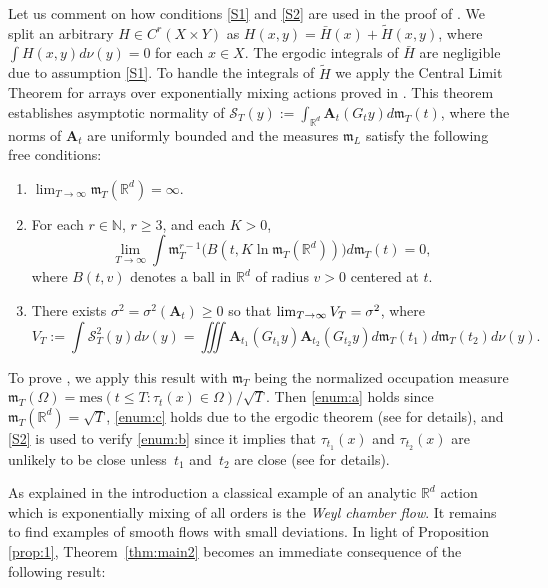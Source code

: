 \documentclass[10pt]{amsart}
\newenvironment{enumeratea}
{\bgroup\def\theenumi{\alph{enumi}}\begin{enumerate}}
{\end{enumerate}\egroup}
\let\DS\relax
\newcommand\cS{\mathcal{S}}
\newcommand\naturals{\mathbb{N}}\let\N\naturals
\newcommand\reals{\mathbb{R}}\let\R\reals
\newcommand\bA{\boldsymbol{A}}
\newcommand\fm{\mathfrak{m}}
\newcommand\mes{\mathrm{mes}}
\theoremstyle{definition}
\theoremstyle{plain}
\begin{document}
Let us comment on how conditions \eqref{S1} and \eqref{S2} are used in the proof of \cite[Th.\,3.2]{DDKN}. We split an arbitrary
$H\in C^r(X\times Y)$ as $H(x,y)=\bar{H}(x)+\tilde{H}(x,y)$,
where $\int H(x,y) d\nu(y)=0$ for each $x\in X$.
The ergodic integrals of $\bar{H}$ are negligible due to assumption \eqref{S1}.
To handle the integrals of $\tilde{H}$ we apply the Central Limit Theorem
for arrays over exponentially mixing actions proved in \cite{BG}.
This theorem establishes asymptotic normality of
$\cS_T(y):=\int_{\reals^d} \bA_t(G_t y) d\fm_T(t)$,
where the norms of $\bA_t$ are uniformly bounded and the measures
$\fm_L$ satisfy the following free conditions:

\begin{enumeratea}
\item\label{enum:a}
$\lim_{T\to\infty}
\fm_T(\R^d)=\infty$.

\item\label{enum:b}
For each $r\in \naturals$, $r\geq 3$, and each $K>0$,\vspace*{-3pt}
\[
\lim_{T\to \infty} \int \fm_T^{r-1}\Big(B(t,K\ln \fm_T(\reals^d))\Big) d\fm_T(t)=0,
\]
where $B(t,v)$ denotes a ball in $\R^d$ of radius $v>0$ centered at $t$.

\item\label{enum:c}
There exists $\sigma^2=\sigma^2(\bA_t)\geq 0 $ so that $\DS \lim_{T\to \infty} V_T=\sigma^2$, where\vspace*{-3pt}\enlargethispage{.5\baselineskip}
\[
V_T:=\int\cS_T^2(y)d\nu(y)= \iiint \bA_{t_1} (G_{t_1} y) \bA_{t_2} (G_{t_2} y) d\fm_T (t_1)
d\fm_T(t_2) d\nu(y).
\]
\end{enumeratea}

To prove \cite[Th.\,3.2]{DDKN}, we apply this result with $\fm_T$ being the normalized occupation measure $\fm_T(\Omega)=\mes(t\leq T: \tau_t(x)\in \Omega)/\sqrt{T}$.
Then \eqref{enum:a} holds since $\fm_T(\reals^d)=\sqrt{T}$, \eqref{enum:c} holds due to the ergodic theorem
(see \cite[\S 5.1.2]{DDKN} for details),
and
\eqref{S2} is used to verify \eqref{enum:b} since it implies that $\tau_{t_1}(x)$ and $\tau_{t_2}(x)$ are
unlikely to be close unless~$t_1$ and~$t_2$ are close (see \cite[\S 5.1.2]{DDKN} for details).

As explained in the introduction a classical example of an analytic $\R^d$ action which is exponentially mixing of all orders is the \emph{Weyl chamber flow}. It remains to find examples of smooth flows with small deviations.
In light of Proposition \ref{prop:1}, Theorem~\ref{thm:main2} becomes an immediate consequence of the following result:
\end{document}
